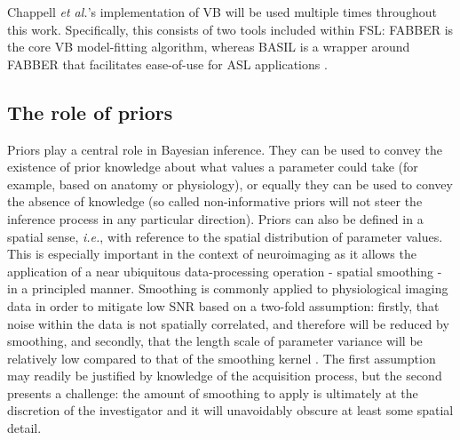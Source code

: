 Chappell \textit{et al.}'s implementation of VB will be used multiple times throughout this work. Specifically, this consists of two tools included within FSL: FABBER is the core VB model-fitting algorithm, whereas BASIL is a wrapper around FABBER that facilitates ease-of-use for ASL applications \cite{Chappell2009, Chappell2011}. 

\subsection{The role of priors}
\label{vb_spatial_prior}

Priors play a central role in Bayesian inference. They can be used to convey the existence of prior knowledge about what values a parameter could take (for example, based on anatomy or physiology), or equally they can be used to convey the absence of knowledge (so called non-informative priors will not steer the inference process in any particular direction). Priors can also be defined in a spatial sense, \textit{i.e.}, with reference to the spatial distribution of parameter values. This is especially important in the context of neuroimaging as it allows the application of a near ubiquitous data-processing operation - spatial smoothing - in a principled manner. Smoothing is commonly applied to physiological imaging data in order to mitigate low SNR based on a two-fold assumption: firstly, that noise within the data is not spatially correlated, and therefore will be reduced by smoothing, and secondly, that the length scale of parameter variance will be relatively low compared to that of the smoothing kernel \cite{Jenkinson2017a}. The first assumption may readily be justified by knowledge of the acquisition process, but the second presents a challenge: the amount of smoothing to apply is ultimately at the discretion of the investigator and it will unavoidably obscure at least some spatial detail. 

